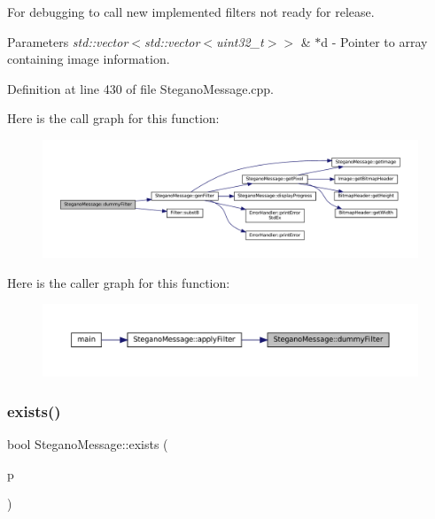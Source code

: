 For debugging to call new implemented filters not ready for release. 


\begin{DoxyParams}{Parameters}
{\em std\+::vector$<$std\+::vector$<$uint32\+\_\+t$>$$>$} & $\ast$d -\/ Pointer to array containing image information. \\
\hline
\end{DoxyParams}


Definition at line 430 of file Stegano\+Message.\+cpp.

Here is the call graph for this function\+:\nopagebreak
\begin{figure}[H]
\begin{center}
\leavevmode
\includegraphics[width=350pt]{classSteganoMessage_a1a26242c2e6d146cba1ad6831ab60ba7_cgraph}
\end{center}
\end{figure}
Here is the caller graph for this function\+:\nopagebreak
\begin{figure}[H]
\begin{center}
\leavevmode
\includegraphics[width=350pt]{classSteganoMessage_a1a26242c2e6d146cba1ad6831ab60ba7_icgraph}
\end{center}
\end{figure}
\mbox{\label{classSteganoMessage_acc5a49a35b46d8bf4c40cca8b8c5a52b}} 
\subsubsection{\texorpdfstring{exists()}{exists()}}
{\footnotesize\ttfamily bool Stegano\+Message\+::exists (\begin{DoxyParamCaption}\item[{std\+::string}]{p }\end{DoxyParamCaption})}



